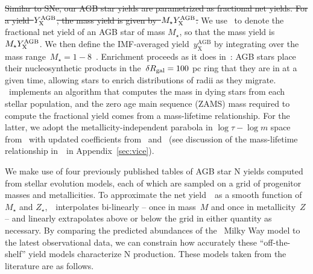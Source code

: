 \documentclass[ms.tex]{subfiles}
\begin{document}
{\color{red}
\sout{
Similar to SNe, our AGB star yields are parametrized as fractional net yields.
For a yield~$Y_\text{X}^\text{AGB}$, the mass yield is given by~$M_\star Y_\text{X}^\text{AGB}$.
}
We use~ to denote the fractional net yield of an AGB star of mass
$M_\star$, so that the mass yield is~$M_\star Y_\text{X}^\text{AGB}$.
We then define the IMF-averaged yield~$y_\text{X}^\text{AGB}$ by integrating
over the mass range~$M_\star = 1 - 8$~\msun.
}
Enrichment proceeds as it does in~\citet{Johnson2021}: AGB stars place their
nucleosynthetic products in the~$\delta R_\text{gal} = 100$ pc ring that they are in at
a given time, allowing stars to enrich distributions of radii as they migrate.
\vice~implements an algorithm that computes the mass in dying stars
from each stellar population, and the zero age main sequence (ZAMS) mass
required to compute the fractional yield comes from a mass-lifetime
relationship. 
For the latter, we adopt the metallicity-independent parabola in
$\log\tau - \log m$ space from~\citet{Larson1974} with updated coefficients
from~\citet{Kobayashi2004} and~\citet*{David1990} (see discussion of the
mass-lifetime relationship in~\vice~in Appendix~\ref{sec:vice}).
\par
We make use of four previously published tables of AGB star N yields
computed from stellar evolution models, each of which are sampled on a grid
of progenitor masses and metallicities.
To approximate the net yield~~as a smooth function of~$M_\star$ and
$Z_\star$,~\vice~interpolates bi-linearly -- once in mass~$M$ and once in
metallicity~$Z$ -- and linearly extrapolates above or below the grid in either
quantity as necessary.
By comparing the predicted abundances of the~\citet{Johnson2021} Milky Way
model to the latest observational data, we can constrain how accurately these
``off-the-shelf'' yield models characterize N production.
These models taken from the literature are as follows.
\end{document}
